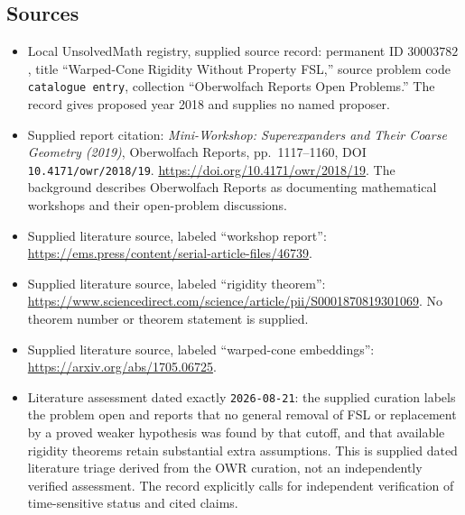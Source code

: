 \documentclass[11pt]{article}
\begin{document}
\subsection{Sources}
\begin{itemize}
\item Local UnsolvedMath registry, supplied source record: permanent ID \(30003782\), title ``Warped-Cone Rigidity Without Property FSL,'' source problem code \texttt{catalogue entry}, collection ``Oberwolfach Reports Open Problems.'' The record gives proposed year 2018 and supplies no named proposer.
\item Supplied report citation: \emph{Mini-Workshop: Superexpanders and Their Coarse Geometry (2019)}, Oberwolfach Reports, pp.\ 1117--1160, DOI \texttt{10.4171/owr/2018/19}. \url{https://doi.org/10.4171/owr/2018/19}. The background describes Oberwolfach Reports as documenting mathematical workshops and their open-problem discussions.
\item Supplied literature source, labeled ``workshop report'': \url{https://ems.press/content/serial-article-files/46739}.
\item Supplied literature source, labeled ``rigidity theorem'': \url{https://www.sciencedirect.com/science/article/pii/S0001870819301069}. No theorem number or theorem statement is supplied.
\item Supplied literature source, labeled ``warped-cone embeddings'': \url{https://arxiv.org/abs/1705.06725}.
\item Literature assessment dated exactly \texttt{2026-08-21}: the supplied curation labels the problem open and reports that no general removal of FSL or replacement by a proved weaker hypothesis was found by that cutoff, and that available rigidity theorems retain substantial extra assumptions. This is supplied dated literature triage derived from the OWR curation, not an independently verified assessment. The record explicitly calls for independent verification of time-sensitive status and cited claims.
\end{itemize}
\end{document}
